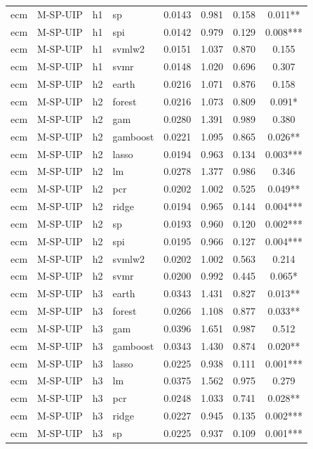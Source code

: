 \begin{ThreePartTable}
\begin{longtable}[t]{llclcccc}
ecm & M-SP-UIP & h1 & sp & 0.0143 & 0.981 & 0.158 & 0.011**\\
ecm & M-SP-UIP & h1 & spi & 0.0142 & 0.979 & 0.129 & 0.008***\\
ecm & M-SP-UIP & h1 & svmlw2 & 0.0151 & 1.037 & 0.870 & 0.155\\
ecm & M-SP-UIP & h1 & svmr & 0.0148 & 1.020 & 0.696 & 0.307\\
\addlinespace
ecm & M-SP-UIP & h2 & earth & 0.0216 & 1.071 & 0.876 & 0.158\\
ecm & M-SP-UIP & h2 & forest & 0.0216 & 1.073 & 0.809 & 0.091*\\
ecm & M-SP-UIP & h2 & gam & 0.0280 & 1.391 & 0.989 & 0.380\\
ecm & M-SP-UIP & h2 & gamboost & 0.0221 & 1.095 & 0.865 & 0.026**\\
ecm & M-SP-UIP & h2 & lasso & 0.0194 & 0.963 & 0.134 & 0.003***\\
ecm & M-SP-UIP & h2 & lm & 0.0278 & 1.377 & 0.986 & 0.346\\
ecm & M-SP-UIP & h2 & pcr & 0.0202 & 1.002 & 0.525 & 0.049**\\
ecm & M-SP-UIP & h2 & ridge & 0.0194 & 0.965 & 0.144 & 0.004***\\
ecm & M-SP-UIP & h2 & sp & 0.0193 & 0.960 & 0.120 & 0.002***\\
ecm & M-SP-UIP & h2 & spi & 0.0195 & 0.966 & 0.127 & 0.004***\\
ecm & M-SP-UIP & h2 & svmlw2 & 0.0202 & 1.002 & 0.563 & 0.214\\
ecm & M-SP-UIP & h2 & svmr & 0.0200 & 0.992 & 0.445 & 0.065*\\
\addlinespace
ecm & M-SP-UIP & h3 & earth & 0.0343 & 1.431 & 0.827 & 0.013**\\
ecm & M-SP-UIP & h3 & forest & 0.0266 & 1.108 & 0.877 & 0.033**\\
ecm & M-SP-UIP & h3 & gam & 0.0396 & 1.651 & 0.987 & 0.512\\
ecm & M-SP-UIP & h3 & gamboost & 0.0343 & 1.430 & 0.874 & 0.020**\\
ecm & M-SP-UIP & h3 & lasso & 0.0225 & 0.938 & 0.111 & 0.001***\\
ecm & M-SP-UIP & h3 & lm & 0.0375 & 1.562 & 0.975 & 0.279\\
ecm & M-SP-UIP & h3 & pcr & 0.0248 & 1.033 & 0.741 & 0.028**\\
ecm & M-SP-UIP & h3 & ridge & 0.0227 & 0.945 & 0.135 & 0.002***\\
ecm & M-SP-UIP & h3 & sp & 0.0225 & 0.937 & 0.109 & 0.001***\\

\end{longtable}
\end{ThreePartTable}
